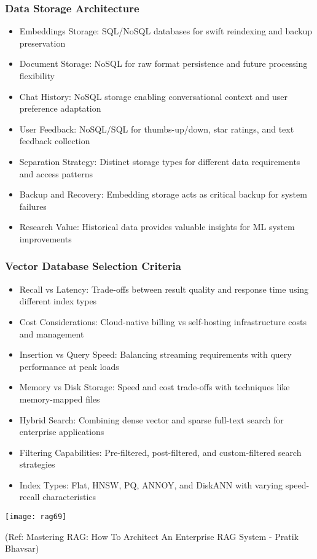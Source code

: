 \begin{frame}[fragile]\frametitle{Data Storage Architecture}
      \begin{itemize}
        \item Embeddings Storage: SQL/NoSQL databases for swift reindexing and backup preservation
        \item Document Storage: NoSQL for raw format persistence and future processing flexibility
        \item Chat History: NoSQL storage enabling conversational context and user preference adaptation
        \item User Feedback: NoSQL/SQL for thumbs-up/down, star ratings, and text feedback collection
        \item Separation Strategy: Distinct storage types for different data requirements and access patterns
        \item Backup and Recovery: Embedding storage acts as critical backup for system failures
        \item Research Value: Historical data provides valuable insights for ML system improvements
      \end{itemize}
\end{frame}

\begin{frame}[fragile]\frametitle{Vector Database Selection Criteria}
      \begin{itemize}
        \item Recall vs Latency: Trade-offs between result quality and response time using different index types
        \item Cost Considerations: Cloud-native billing vs self-hosting infrastructure costs and management
        \item Insertion vs Query Speed: Balancing streaming requirements with query performance at peak loads
        \item Memory vs Disk Storage: Speed and cost trade-offs with techniques like memory-mapped files
        \item Hybrid Search: Combining dense vector and sparse full-text search for enterprise applications
        \item Filtering Capabilities: Pre-filtered, post-filtered, and custom-filtered search strategies
        \item Index Types: Flat, HNSW, PQ, ANNOY, and DiskANN with varying speed-recall characteristics
      \end{itemize}
	  
	\begin{center}
	\texttt{[image: rag69]}
	
	{\tiny (Ref: Mastering RAG: How To Architect An Enterprise RAG System - Pratik Bhavsar)}
	
	\end{center}	  
\end{frame}

